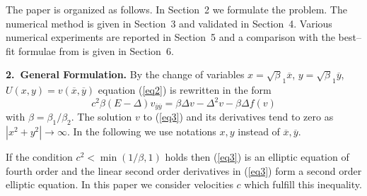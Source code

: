 \documentclass[leqno,11pt]{book}
\newcommand{\rf}[1]{(\ref{#1})}
\newcommand{\sect}[1]{\bigskip \par {\large\bf #1}}
\begin{document}
The paper is organized as follows. In Section~2 we formulate the  problem. The numerical method is given in Section~3 and validated in Section~4.  Various numerical  experiments are reported in Section~5 and a comparison with the best--fit formulae from \cite{Ch2011} is given in Section~6.

\bigskip

\sect{2.~General Formulation.}
By the change of variables $x=\sqrt\beta_1 { \overline x}$, $y=\sqrt\beta_1 { \overline y}$, $U(x,y)= v({ \overline x},{ \overline y} )$ 
 equation \rf{eq2} is rewritten in the form 
 \begin{equation}\label{eq3}
c^2 \beta (E- \Delta) v_{{\overline y}{\overline y}} = \beta \Delta v - \Delta^2 v - \beta \Delta f(v)
\end{equation}
with   $\beta = \beta_1 / \beta_2$.
The solution $v$ to \rf{eq3} and its derivatives  tend to zero as $|x^2 +y^2|\rightarrow \infty$.
In the following we use notations $x,y$ instead of ${\overline x},{\overline y}$.

If the condition $c^2 < \min (1/ \beta,1)$ holds then  \rf{eq3} is an elliptic equation of fourth order and the linear second order derivatives in \rf{eq3} form  a second order elliptic equation. In this paper we consider velocities $c$ which fulfill this inequality.
\end{document}
